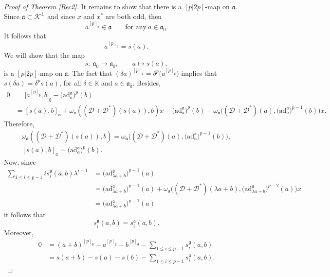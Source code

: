 \documentclass[pdftex]{sigma}
\numberwithin{equation}{section}
\begin{document}
\begin{proof}[Proof of Theorem \ref{Rec2}]
It remains to show that there is a $[p|2p]$-map on $\mathfrak{a}$. Since $\mathfrak{a} \subset \mathscr{K}^\perp$ and since $x$ and $x^*$ are both odd, then
\[
a^{[p]_\mathfrak{g}}\in \mathfrak{a} \qquad \text{for any}\ a \in \mathfrak{a}_{\bar 0}.
\]
It follows that
\begin{equation*}
a^{[p]_\mathfrak{g}}=s(a).
\end{equation*}
We will show that the map
\[
s\colon\ \mathfrak{a}_{\bar 0} \rightarrow \mathfrak{a}_{\bar 0}, \qquad a\mapsto s(a),
\]
is a $[p|2p]$-map on $\mathfrak{a}$.
The fact that $(\delta a)^{[p]_\mathfrak{g}}=\delta^p\bigl(a^{[p]_\mathfrak{g}}\bigr)$ implies that $s(\delta a)=\delta^p s(a)$, for all $\delta\in \mathbb K$ and $a\in \mathfrak{a}_{\bar 0}$. Besides,
\begin{align*}
0&=\big[a^{[p]_\mathfrak{g}},b\big]_\mathfrak{g}-\bigl(\mathrm{ad}_a^\mathfrak{g}\bigr)^{p}(b)\\
&=[s(a),b]_\mathfrak{a}+\omega_\mathfrak{a}(({\mathscr D} + {\mathscr D}^*)(s(a)), b) x -\bigl(\mathrm{ad}_a^\mathfrak{a}\bigr)^p(b)- \omega_\mathfrak{a}\bigl(({\mathscr D} + {\mathscr D}^*)(a),\bigl(\mathrm{ad}_a^\mathfrak{a}\bigr)^{p-1}(b)\bigr) x.
\end{align*}
Therefore,
\begin{gather*}
\omega_\mathfrak{a}(({\mathscr D}+{\mathscr D}^*)(s(a)), b) = \omega_\mathfrak{a}\bigl(({\mathscr D}+{\mathscr D}^*)(a),\bigl(\mathrm{ad}_a^\mathfrak{a}\bigr)^{p-1}(b)\bigr),\\
[s(a),b]_\mathfrak{a} =\bigl(\mathrm{ad}_a^\mathfrak{a}\bigr)^p(b).
\end{gather*}
Now, since
\begin{align*}
 \sum_{1\leq i \leq p-1} is_i^\mathfrak{g}(a,b) \lambda^{i-1}&=\bigl(\mathrm{ad}_{\lambda a+b}^\mathfrak{g}\bigr)^{p-1}(a)\\
&=\bigl(\mathrm{ad}_{\lambda a+b}^\mathfrak{a}\bigr)^{p-1}(a)+\omega_\mathfrak{a}\bigl(({\mathscr D}+{\mathscr D}^*)(\lambda a+b),\bigl(\mathrm{ad}_{\lambda a+b}^\mathfrak{a}\bigr)^{p-2}(a) \bigr)x\\
&= \bigl(\mathrm{ad}_{\lambda a+b}^\mathfrak{a}\bigr)^{p-1}(a)
\end{align*}
it follows that
\[
s^\mathfrak{g}_i(a,b)=s_i^{\mathfrak{a}}(a,b).
\]
Moreover,
\begin{align*}
0&=(a+b)^{[p]_\mathfrak{g}}-a^{[p]_\mathfrak{g}}-b^{[p]_\mathfrak{g}}- \sum_{1\leq i \leq p-1}s_i^\mathfrak{g}(a,b)\\
&=s(a+b)-s(a)-s(b)- \sum_{1\leq i \leq p-1}s_i^{\mathfrak{a}}(a,b).

\end{align*}
\end{proof}
\end{document}
